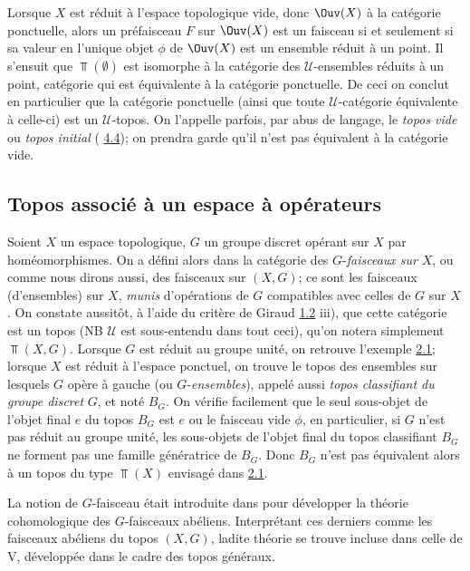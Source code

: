 \documentclass[10pt]{../fichiers-configuration-latex/smfart}
\begin{document}
Lorsque $X$ est réduit à l'espace topologique vide, donc
$\Ouv(X)$ à la catégorie ponctuelle, alors un préfaisceau $F$
sur $\Ouv(X)$ est un faisceau si et seulement si sa valeur en
l'unique objet $\phi$ de $\Ouv(X)$ est un ensemble réduit à un
point. Il s'ensuit que $\Top(∅)$ est isomorphe à la catégorie
des $𝒰$-ensembles réduits à un point, catégorie qui
est équivalente à la catégorie ponctuelle. De ceci on conclut
en particulier que la catégorie ponctuelle (ainsi que toute
$𝒰$-catégorie équivalente à celle-ci) est un
$𝒰$-topos. On l'appelle parfois, par abus de\pageoriginale
langage, le \emph{topos vide} ou \emph{topos initial} (\cf
\hyperref[IV.subsec4.4]{4.4}); on prendra garde qu'il n'est pas équivalent
à la catégorie vide.

\subsection{Topos associé à un espace à opérateurs}

Soient $X$ un espace topologique, $G$ un groupe discret opérant
sur $X$ par homéomorphismes. On a défini alors dans  la catégorie des $G$-\emph{faisceaux sur} $X$,
ou comme nous dirons aussi, des faisceaux sur $(X,G)$; ce sont les
faisceaux (d'ensembles) sur $X$, \emph{munis} d'opérations de $G$
compatibles avec celles de $G$ sur $X$. On constate aussitôt, à
l'aide du critère de Giraud \hyperref[IV.theo1.2]{1.2} iii), que cette %
catégorie est un topos (NB $𝒰$ est sous-entendu dans tout
ceci), qu'on notera simplement $\Top(X,G)$. Lorsque $G$ est réduit
au groupe unité, on retrouve l'exemple \hyperref[IV.subsec2.1]{2.1}; lorsque
$X$ est réduit à l'espace ponctuel, on trouve le topos des
ensembles sur lesquels $G$ opère à gauche (ou
$G$-\emph{ensembles}), appelé aussi \emph{topos classifiant du
groupe discret} $G$, et noté $B_G$. On vérifie facilement que le
seul sous-objet de l'objet final $e$ du topos $B_G$ est $e$ ou le
faisceau vide $\phi$, en particulier, si $G$ n'est pas réduit au
groupe unité, les sous-objets de l'objet final du topos
classifiant $B_G$ ne forment pas une famille génératrice de
$B_G$. Donc $B_G$ n'est pas équivalent alors à un topos du type
$\Top(X)$ envisagé dans \hyperref[IV.subsec2.1]{2.1}.

La notion de $G$-faisceau était introduite dans \loccit pour
développer la théorie cohomologique des $G$-faisceaux
abéliens. Interprétant ces derniers comme les faisceaux
abéliens du topos $(X,G)$, ladite théorie se trouve incluse dans
celle de \Exp V, développée dans le cadre des topos
généraux.
\end{document}
